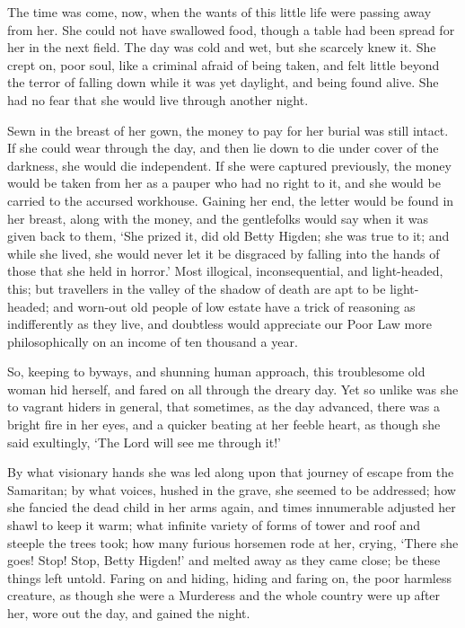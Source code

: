 The time was come, now, when the wants of this little life were passing
away from her. She could not have swallowed food, though a table had
been spread for her in the next field. The day was cold and wet, but
she scarcely knew it. She crept on, poor soul, like a criminal afraid of
being taken, and felt little beyond the terror of falling down while it
was yet daylight, and being found alive. She had no fear that she would
live through another night.

Sewn in the breast of her gown, the money to pay for her burial was
still intact. If she could wear through the day, and then lie down to
die under cover of the darkness, she would die independent. If she were
captured previously, the money would be taken from her as a pauper who
had no right to it, and she would be carried to the accursed workhouse.
Gaining her end, the letter would be found in her breast, along with
the money, and the gentlefolks would say when it was given back to them,
‘She prized it, did old Betty Higden; she was true to it; and while she
lived, she would never let it be disgraced by falling into the hands
of those that she held in horror.’ Most illogical, inconsequential, and
light-headed, this; but travellers in the valley of the shadow of death
are apt to be light-headed; and worn-out old people of low estate have
a trick of reasoning as indifferently as they live, and doubtless
would appreciate our Poor Law more philosophically on an income of ten
thousand a year.

So, keeping to byways, and shunning human approach, this troublesome
old woman hid herself, and fared on all through the dreary day. Yet so
unlike was she to vagrant hiders in general, that sometimes, as the day
advanced, there was a bright fire in her eyes, and a quicker beating at
her feeble heart, as though she said exultingly, ‘The Lord will see me
through it!’

By what visionary hands she was led along upon that journey of escape
from the Samaritan; by what voices, hushed in the grave, she seemed
to be addressed; how she fancied the dead child in her arms again, and
times innumerable adjusted her shawl to keep it warm; what infinite
variety of forms of tower and roof and steeple the trees took; how many
furious horsemen rode at her, crying, ‘There she goes! Stop! Stop,
Betty Higden!’ and melted away as they came close; be these things left
untold. Faring on and hiding, hiding and faring on, the poor harmless
creature, as though she were a Murderess and the whole country were up
after her, wore out the day, and gained the night.

